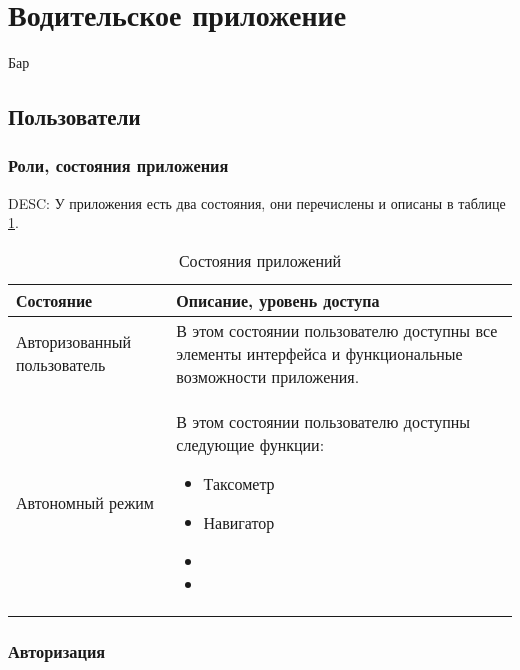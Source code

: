 \section{Водительское приложение}

  Бар


  \subsection{Пользователи}

      \subsubsection{Роли, состояния приложения}

      		DESC: У приложения есть два состояния, они перечислены и описаны в таблице \ref{app_state}. 

             \begin{table}
             \begin{center}
             \label{app_state}
             \caption {Состояния приложений}
             \setlength{\extrarowheight}{2mm}
             \begin{tabular}{|p{5cm}|p{10cm}|}
                 \hline     \textbf{Состояние}&\textbf{Описание, уровень доступа} \\ [2mm]

                 \hline   Авторизованный пользователь & В этом состоянии пользователю доступны все элементы интерфейса и функциональные возможности приложения.\\ [2mm]
                 \hline   Автономный режим & В этом состоянии пользователю доступны следующие функции: \begin{itemize} \item Таксометр \item Навигатор \item \item\end{itemize}\\ [2mm]
                  \hline
             \end{tabular}
             \end{center}
             \end{table}

  	  \subsubsection{Авторизация}

